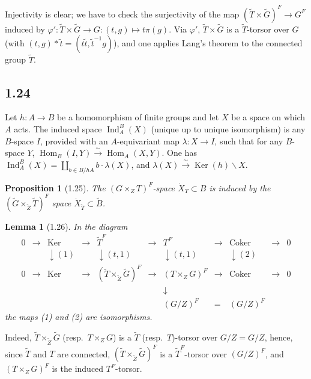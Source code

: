 \documentclass[11pt]{amsart}
\theoremstyle{plain}
\newtheorem{lemma}[theorem]{Lemma}
\newtheorem{proposition}[theorem]{Proposition}
\theoremstyle{remark}
\DeclareMathOperator{\Hom}{Hom}
\DeclareMathOperator{\Ker}{Ker}
\DeclareMathOperator{\Ind}{Ind}
\DeclareMathOperator{\Coker}{Coker}
\begin{document}
Injectivity is clear; we have to check the surjectivity of the map $(\tilde{T} \times \tilde{G})^F \to G^F$ induced by $\varphi': \tilde{T} \times \tilde{G} \to G: (t, g) \mapsto t\pi(g)$. Via $\varphi'$, $\tilde{T} \times \tilde{G}$ is a $\tilde{T}$-torsor over $G$ (with $(t, g) * \tilde{t} = (t\tilde{t}, \tilde{t}^{-1}g)$), and one applies Lang's theorem to the connected group $\tilde{T}$.

\subsection{1.24} Let $h: A \to B$ be a homomorphism of finite groups and let $X$ be a space on which $A$ acts. The induced space $\Ind_A^B(X)$ (unique up to unique isomorphism) is any $B$-space $I$, provided with an $A$-equivariant map $\lambda: X \to I$, such that for any $B$-space $Y$, $\Hom_B(I, Y) \xrightarrow{\sim} \Hom_A(X, Y)$. One has $\Ind_A^B(X) = \coprod_{b \in B/hA} b \cdot \lambda(X)$, and $\lambda(X) \xrightarrow{\sim} \Ker(h) \backslash X$.

\begin{proposition}[1.25]
The $(G \times_Z T)^F$-space $\dot{X}_T \subset B$ is induced by the $(\tilde{G} \times_{\tilde{Z}} \tilde{T})^F$ space $\dot{X}_{\tilde{T}} \subset \tilde{B}$.
\end{proposition}

\begin{lemma}[1.26]
In the diagram
\[
\begin{array}{ccccccccccc}
0 & \longrightarrow & \Ker & \longrightarrow & \tilde{T}^F & \longrightarrow & T^F & \longrightarrow & \Coker & \longrightarrow & 0 \\
& & \downarrow{(1)} & & \downarrow{(t,1)} & & \downarrow{(t,1)} & & \downarrow{(2)} & & \\
0 & \longrightarrow & \Ker & \longrightarrow & (\tilde{T} \times_{\tilde{Z}} \tilde{G})^F & \longrightarrow & (T \times_Z G)^F & \longrightarrow & \Coker & \longrightarrow & 0 \\
& & & & & & \downarrow & & & \\
& & & & & & (G/Z)^F & = & (G/Z)^F &
\end{array}
\]
the maps (1) and (2) are isomorphisms.
\end{lemma}

Indeed, $\tilde{T} \times_{\tilde{Z}} \tilde{G}$ (resp.\ $T \times_Z G$) is a $\tilde{T}$ (resp.\ $T$)-torsor over $G/Z = G/Z$, hence, since $\tilde{T}$ and $T$ are connected, $(\tilde{T} \times_{\tilde{Z}} \tilde{G})^F$ is a $\tilde{T}^F$-torsor over $(G/Z)^F$, and $(T \times_Z G)^F$ is the induced $T^F$-torsor.
\end{document}

